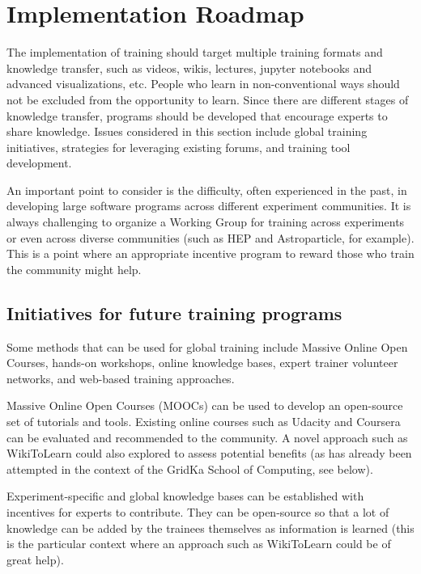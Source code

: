 \documentclass[12pt,a4paper]{article}
\begin{document}
\section{Implementation Roadmap}
The implementation of training should target multiple training formats and knowledge transfer, such as videos, wikis, lectures, jupyter notebooks and advanced visualizations, etc.
People who learn in non-conventional ways should not be excluded from the
opportunity to learn. Since there are different stages of knowledge transfer,
programs should be developed that encourage experts to share knowledge. Issues
considered in this section include global training initiatives, strategies for
leveraging existing forums, and training tool development.

An important point to consider is the difficulty, often experienced in the past,
in developing large software programs across different experiment communities.
It is always challenging to organize a Working Group for training across
experiments or even across diverse communities (such as HEP and Astroparticle,
for example). This is a point where an appropriate incentive program to reward
those who train the community might help.

\subsection{Initiatives for future training programs\label{sec:initiatives}} 

Some methods that can be used for global training include Massive Online Open
Courses, hands-on workshops, online knowledge bases, expert trainer volunteer
networks, and web-based training approaches.

Massive Online Open Courses (MOOCs) can be used to develop an open-source set of
tutorials and tools. Existing online courses such as Udacity and Coursera can be
evaluated and recommended to the community. A novel approach such as WikiToLearn
could also explored to assess potential benefits (as has already been attempted
in the context of the GridKa School of Computing, see below).

Experiment-specific and global knowledge bases can be established with
incentives for experts to contribute. They can be open-source so that a lot of
knowledge can be added by the trainees themselves as information is learned
(this is the particular context where an approach such as WikiToLearn could be
of great help).
\end{document}
